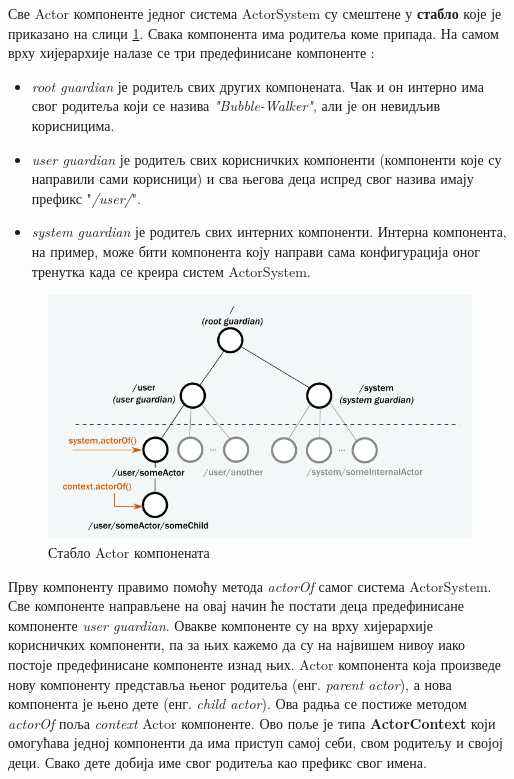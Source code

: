 \documentclass[12pt,oneside]{memoir}
\begin{document}
Све Actor компоненте једног система ActorSystem су смештене у \textbf{стабло} које је приказано на слици \ref{fig:stablo}. Свака компонента има родитеља коме припада. На самом врху хијерархије налазе се три предефинисане компоненте \cite{akkaDoc}:
\begin{itemize}
\item \textit{root guardian} је родитељ свих других компонената. Чак и он интерно има свог родитеља који се назива \textit{"Bubble-Walker"}, али је он невидљив корисницима.
\item \textit{user guardian} је родитељ свих корисничких компоненти (компоненти које су направили сами корисници) и сва његова деца испред свог назива имају префикс "\textit{/user/}".
\item \textit{system guardian} је родитељ свих интерних компоненти. Интерна компонента, на пример, може бити компонента коју направи сама конфигурација оног тренутка када се креира систем ActorSystem. 
\end{itemize}

\begin{figure}[!ht]
  \centering
  \includegraphics[width=1\textwidth]{akkaTree.png}
  \caption{Стабло Actor компонената}
  \label{fig:stablo}
\end{figure}

Прву компоненту правимо помоћу метода \textit{actorOf} самог система ActorSystem. Све компоненте направљене на овај начин ће постати деца предефинисане компоненте \textit{user guardian}. Овакве компоненте су на врху хијерархије корисничких компоненти, па за њих кажемо да су на највишем нивоу иако постоје предефинисане компоненте изнад њих. Actor компонента која произведе нову компоненту представља њеног родитеља (енг. \textit{parent actor}), а нова компонента је њено дете (енг. \textit{child actor}). Ова радња се постиже методом \textit{actorOf} поља \textit{context} Actor компоненте. Ово поље је типа \textbf{ActorContext} који омогућава једној компоненти да има приступ самој себи, свом родитељу и својој деци. Свако дете добија име свог родитеља као префикс свог имена.
\end{document}
